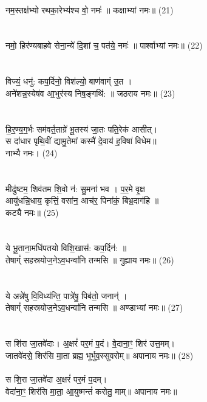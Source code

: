 \\
नम॒स्तक्ष॑भ्यो रथका॒रेभ्य॑श्च वो॒  नमः॑ ॥ कक्षाभ्यां नमः॥ (21)\\
{\small{}}\\
\\
नमो॒ हिर॑ण्यबाहवे सेना॒न्ये॑ दि॒शां च॒ पत॑ये॒  नमः॑ ॥ पार्श्वाभ्यां नमः॥ (22)\\
{\small{}}\\
\\
विज्यं॒ धनु॑: कप॒र्दिनो॒ विश॑ल्यो॒ बाण॑वाग्ं उ॒त ।\\
अने॑शन्न॒स्येष॑व आ॒भुर॑स्य निष॒ङ्गथि॑: ॥ जठराय नमः॥ (23)\\
{\small{}}\\
\\
हि॒र॒ण्य॒ग॒र्भः सम॑वर्त॒ताग्रे॑ भू॒तस्य॑ जा॒तः पति॒रेक॑ आसीत्।\\
स दा॑धार पृथि॒वीं द्यामु॒तेमां कस्मै॑ दे॒वाय॑ ह॒विषा॑ विधेम॥ \\
नाभ्यै नमः। (24)	\\
{\small{}}\\
\\
मीढु॑ष्टम॒ शिव॑तम शि॒वो न॑: सु॒मना॑ भव । प॒र॒मे वृ॒क्ष \\
आयु॑धन्नि॒धाय॒ कृत्तिं॒ वसा॑न॒ आच॑र॒ पिना॑कं॒ बिभ्र॒दाग॑हि ॥ \\
कट्यै नमः॥ (25)\\
{\small{}}\\
    \\
ये भू॒ताना॒मधि॑पतयो विशि॒खास॑: कप॒र्दिन॑: ॥\\
तेषाग्ं॑ सहस्रयोज॒नेऽव॒धन्वा॑नि तन्मसि ॥ गुह्याय नमः॥ (26)\\
{\small{}}\\
\\
ये अन्ने॑षु वि॒विध्य॑न्ति॒ पात्रे॑षु॒ पिब॑तो॒ जनान्॑ ।\\
तेषाग्ं॑ सहस्रयोज॒नेऽव॒धन्वा॑नि तन्मसि ॥ अण्डाभ्यां नमः॥ (27)\\
{\small{}}\\
\\
स शि॑रा जा॒तवे॑दाः। अ॒क्षरं॑ पर॒मं प॒दं। वे॒दाना॒ꣳ॒ शिर॑ उत्त॒मम्।\\
जातवे॑दसे॒ शिर॑सि मा॒ता ब्रह्म॒ भूर्भुव॒स्सुवरोम्‌॥ अपानाय नमः॥ (28)\\
{\small{}}\\
{\small स शि॒रा जा॒तवे॑दा अ॒क्षरं॑ पर॒मं प॒दम्।\\
वेदा॑ना॒ꣳ॒ शिर॑सि मा॒ता॒ आ॒युष्मन्तं॑ करोतु॒ माम्॥ अपानाय नमः॥ }\\
